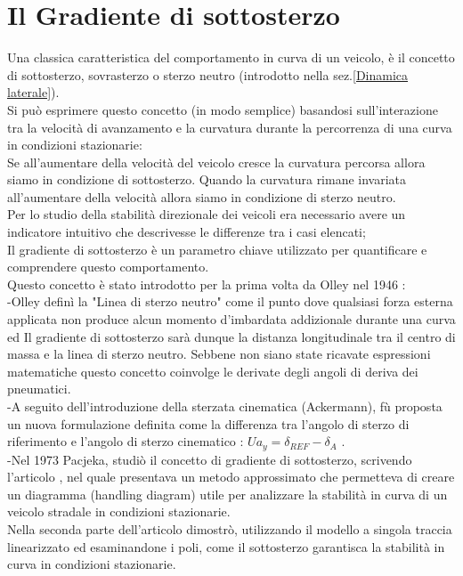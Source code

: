 \chapter{Il Gradiente di sottosterzo}
\label{cha:cap2}
Una classica caratteristica del comportamento in curva di un veicolo, è il concetto di
sottosterzo, sovrasterzo o sterzo neutro (introdotto nella sez.\ref{Dinamica laterale}).\\
Si può esprimere questo concetto (in modo semplice) basandosi sull’interazione tra la velocità di avanzamento e la 
curvatura durante la percorrenza di una curva in condizioni stazionarie:\\
Se all’aumentare della velocità del veicolo cresce la curvatura percorsa allora 
siamo in condizione di sottosterzo.
Quando la curvatura rimane invariata all’aumentare della velocità allora siamo in
condizione di sterzo neutro.\\
Per lo studio della stabilità direzionale dei veicoli era necessario avere un indicatore intuitivo che descrivesse le
differenze tra i casi elencati;\\ 
Il gradiente di sottosterzo è un parametro chiave utilizzato per quantificare e comprendere questo comportamento.\\
Questo concetto è stato introdotto per la prima volta da Olley nel 1946 \cite{Olley1946RoadMO}:\\
-Olley definì la "Linea di sterzo neutro" come il punto dove qualsiasi forza esterna applicata non produce alcun momento
d'imbardata addizionale durante una curva ed Il gradiente di sottosterzo sarà dunque la distanza longitudinale tra il 
centro di massa e la linea di sterzo neutro.
Sebbene non siano state ricavate espressioni matematiche questo concetto coinvolge le derivate degli angoli di deriva dei
pneumatici.\\
-A seguito dell'introduzione della sterzata cinematica (Ackermann), fù proposta un nuova formulazione definita come la differenza tra l'angolo di sterzo di riferimento e l'angolo di sterzo cinematico : $Ua_y = \delta_{REF} - \delta_A$ \cite{society1965vehicle}.\\
-Nel 1973 Pacjeka, studiò il concetto di gradiente di sottosterzo, scrivendo l'articolo \cite{doi:10.1080/00423117308968439}, nel quale presentava un metodo approssimato che permetteva di
creare un diagramma (handling diagram) utile per analizzare la stabilità in curva di un veicolo 
stradale in condizioni stazionarie.\\
Nella seconda parte dell'articolo \cite{doi:10.1080/00423117308968440} dimostrò, utilizzando il modello a singola traccia linearizzato ed esaminandone i poli, come il sottosterzo garantisca la stabilità in curva in condizioni stazionarie.\\
